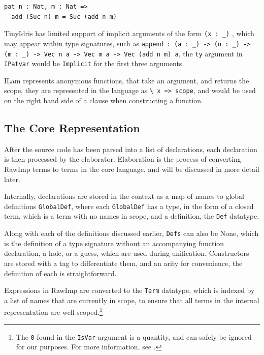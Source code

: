 \documentclass[a4paper]{article}
\begin{document}
\begin{center}
\begin{verbatim}
pat n : Nat, m : Nat =>
  add (Suc n) m = Suc (add n m) 
\end{verbatim}
\end{center}

TinyIdris has limited support of implicit arguments of the form
\texttt{(x : \_)} , which may appear within type signatures, such as
\texttt{append : (a : \_) -> (n : \_) -> (m : \_) -> Vec n a -> Vec m a -> Vec (add n m) a}, the \texttt{ty} argument in \texttt{IPatvar} would
be \texttt{Implicit} for the first three arguments. 

ILam represents anonymous functions, that take an argument, and returns the
scope, they are represented in the language as \texttt{\textbackslash{} x => scope}, and would
be used on the right hand side of a clause when constructing a function.

\subsection{The Core Representation}
\label{sec:orgc03189c}

After the source code has been parsed into a list of declarations, each 
declaration is then processed by the elaborator. Elaboration is 
the process of converting RawImp terms to terms in the core language,
and will be discussed in more detail later. 

Internally, declarations are stored in the context as a map of names 
to global definitions \texttt{GlobalDef}, where each \texttt{GlobalDef} has a type, in the 
form of a closed term, which is a term with no names in scope, and a 
definition, the \texttt{Def} datatype.

Along with each of the definitions discussed earlier, \texttt{Defs} can also be
None, which is the definition of a type signature without an 
accompanying function declaration, a hole, or a guess, which are used 
during unification. Constructors are
stored with a tag to differentiate them, and an arity for convenience,
the definition of each is straightforward.

Expressions in RawImp are converted to the \texttt{Term} datatype, which is 
indexed by a list of names that are currently in scope, to ensure that
all terms in the internal representation are well scoped.\footnote{The \texttt{0} found
in the \texttt{IsVar} argument is a quantity, and can safely be ignored for our purposes.
For more information, see \cite{BibEntry2020Nov}.}
\end{document}
